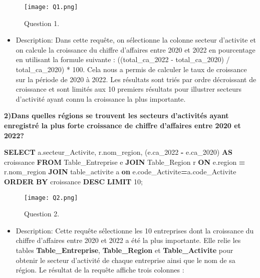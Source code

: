 \documentclass[mstat,12pt]{unswthesis}
\newenvironment{Shaded}{\begin{snugshade}}{\end{snugshade}}
\newcommand{\DecValTok}[1]{\textcolor[rgb]{0.00,0.00,0.81}{#1}}
\newcommand{\KeywordTok}[1]{\textcolor[rgb]{0.13,0.29,0.53}{\textbf{#1}}}
\newcommand{\NormalTok}[1]{#1}
\newcommand{\OperatorTok}[1]{\textcolor[rgb]{0.81,0.36,0.00}{\textbf{#1}}}
\begin{document}
\begin{figure}
\centering
\texttt{[image: Q1.png]}
\caption{Question 1.}
\end{figure}

\bigskip

\begin{itemize}
\tightlist
\item
  Description: Dans cette requête, on sélectionne la colonne secteur
  d'activite et on calcule la croissance du chiffre d'affaires entre
  2020 et 2022 en pourcentage en utilisant la formule suivante :
  ((total\_ca\_2022 - total\_ca\_2020) / total\_ca\_2020) * 100. Cela
  nous a permis de calculer le taux de croissance sur la période de 2020
  à 2022. Les résultats sont triés par ordre décroissant de croissance
  et sont limités aux 10 premiers résultats pour illustrer secteurs
  d'activité ayant connu la croissance la plus importante. \bigskip
\end{itemize}

\textbf{2)Dans quelles régions se trouvent les secteurs d'activités
ayant enregistré la plus forte croissance de chiffre d'affaires entre
2020 et 2022?} \medskip

\begin{Shaded}
\begin{Highlighting}[]
\KeywordTok{SELECT}\NormalTok{ a.secteur\_Activite, r.nom\_region, }
\NormalTok{       (e.ca\_2022 }\OperatorTok{{-}}\NormalTok{ e.ca\_2020) }\KeywordTok{AS}\NormalTok{ croissance}
\KeywordTok{FROM}\NormalTok{ Table\_Entreprise e}
\KeywordTok{JOIN}\NormalTok{ Table\_Region r }\KeywordTok{ON}\NormalTok{ e.region }\OperatorTok{=}\NormalTok{ r.nom\_region}
\KeywordTok{JOIN}\NormalTok{ table\_activite a }\KeywordTok{on}\NormalTok{ e.code\_Activite}\OperatorTok{=}\NormalTok{a.code\_Activite}
\KeywordTok{ORDER} \KeywordTok{BY}\NormalTok{ croissance }\KeywordTok{DESC}
\KeywordTok{LIMIT} \DecValTok{10}\NormalTok{;}
\end{Highlighting}
\end{Shaded}

\begin{figure}
\centering
\texttt{[image: Q2.png]}
\caption{Question 2.}
\end{figure}

\begin{itemize}
\tightlist
\item
  Description: Cette requête sélectionne les 10 entreprises dont la
  croissance du chiffre d'affaires entre 2020 et 2022 a été la plus
  importante. Elle relie les tables \textbf{Table\_Entreprise},
  \textbf{Table\_Region} et \textbf{Table\_Activite} pour obtenir le
  secteur d'activité de chaque entreprise ainsi que le nom de sa région.
  Le résultat de la requête affiche trois colonnes :
\end{itemize}
\end{document}
